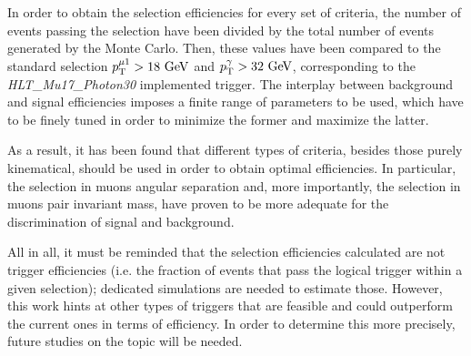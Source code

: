 \documentclass[11pt, a4paper]{article}
\newcommand{\GeV}{\textrm{ }\mathrm{GeV}}
\newcommand{\pt}{p_{\rm T}}
\begin{document}
In order to obtain the selection efficiencies for every set of criteria, the number of events passing the selection have been divided by the total number of events generated by the Monte Carlo. Then, these values have been compared to the standard selection $\pt^{\mu 1}>18\GeV$ and $\pt^{\gamma}>32\GeV$, corresponding to the {\it HLT\_Mu17\_Photon30} implemented trigger. The interplay between background and signal efficiencies imposes a finite range of parameters to be used, which have to be finely tuned in order to minimize the former and maximize the latter.

As a result, it has been found that different types of criteria, besides those purely kinematical, should be used in order to obtain optimal efficiencies. In particular, the selection in muons angular separation and, more importantly, the selection in muons pair invariant mass, have proven to be more adequate for the discrimination of signal and background.

All in all, it must be reminded that the selection efficiencies calculated are not trigger efficiencies (i.e. the fraction of events that pass the logical trigger within a given selection); dedicated simulations are needed to estimate those. However, this work hints at other types of triggers that are feasible and could outperform the current ones in terms of efficiency. In order to determine this more precisely, future studies on the topic will be needed.

\appendix
\cleardoublepage

\end{document}
